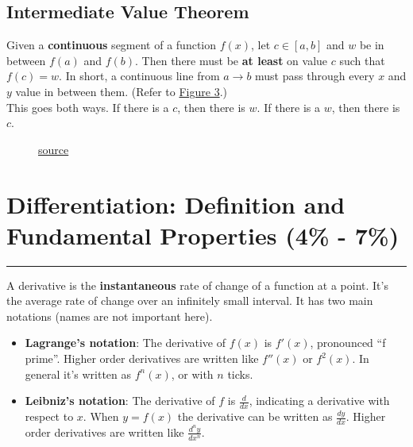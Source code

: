 \documentclass[12pt]{article}
\begin{document}
        \subsection{Intermediate Value Theorem} %
            Given a \textbf{continuous} segment of a function $f(x)$, let $c \in [a, b]$ and $w$ be in between $f(a)$ and $f(b)$. Then there must be \textbf{at least} on value $c$ such that $f(c) = w$. In short, a continuous line from $a \to b$ must pass through every $x$ and $y$ value in between them. (Refer to \hyperref[fig:intvaltheorem]{Figure 3}.)
            \newline
            \\ This goes both ways. If there is a $c$, then there is  $w$. If there is a $w$, then there is $c$.
            \begin{figure}[H]
                \begin{center}
                    \caption{\href{https://www.mathsisfun.com/algebra/intermediate-value-theorem.html}{source}}
                    \label{fig:intvaltheorem}
                \end{center}
            \end{figure}

    \section{Differentiation: Definition and Fundamental Properties (4\% - 7\%)}
    \par\noindent\rule{\textwidth}{0.1pt}
        A derivative is the \textbf{instantaneous} rate of change of a function at a point. It's the average rate of change over an infinitely small interval. It has two main notations (names are not important here).
        \begin{itemize} %
            \item \textbf{Lagrange's notation}:
            The derivative of $f(x)$ is $f'(x)$, pronounced ``f prime''. Higher order derivatives are written like $f''(x)$ or $f^2(x)$. In general it's written as $f^{n}(x)$, or with $n$ ticks.
            \item \textbf{Leibniz's notation}:
            The derivative of $f$ is $\frac{d}{dx}$, indicating a derivative with respect to $x$. When $y=f(x)$ the derivative can be written as $\frac{dy}{dx}$. Higher order derivatives are written like $\frac{d^{n}y}{dx^{n}}$.
        \end{itemize}
\end{document}
